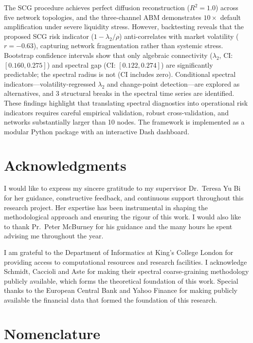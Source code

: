 \documentclass[11pt,a4paper]{report}
\begin{document}
The SCG procedure achieves perfect diffusion reconstruction ($R^2 = 1.0$) across five network topologies, and the three-channel ABM demonstrates $10\times$ default amplification under severe liquidity stress. However, backtesting reveals that the proposed SCG risk indicator ($1 - \lambda_2/\rho$) anti-correlates with market volatility ($r = -0.63$), capturing network fragmentation rather than systemic stress. Bootstrap confidence intervals show that only algebraic connectivity ($\lambda_2$, CI: $[0.160, 0.275]$) and spectral gap (CI: $[0.122, 0.274]$) are significantly predictable; the spectral radius is not (CI includes zero). Conditional spectral indicators---volatility-regressed $\lambda_2$ and change-point detection---are explored as alternatives, and 3 structural breaks in the spectral time series are identified. These findings highlight that translating spectral diagnostics into operational risk indicators requires careful empirical validation, robust cross-validation, and networks substantially larger than 10 nodes. The framework is implemented as a modular Python package with an interactive Dash dashboard.


\chapter*{Acknowledgments}

I would like to express my sincere gratitude to my supervisor Dr.\ Teresa Yu Bi for her guidance, constructive feedback, and continuous support throughout this research project. Her expertise has been instrumental in shaping the methodological approach and ensuring the rigour of this work. I would also like to thank Pr.\ Peter McBurney for his guidance and the many hours he spent advising me throughout the year.

I am grateful to the Department of Informatics at King's College London for providing access to computational resources and research facilities. I acknowledge Schmidt, Caccioli and Aste for making their spectral coarse-graining methodology publicly available, which forms the theoretical foundation of this work. Special thanks to the European Central Bank and Yahoo Finance for making publicly available the financial data that formed the foundation of this research.


\tableofcontents
\listoffigures
\listoftables


\chapter*{Nomenclature}
\end{document}
